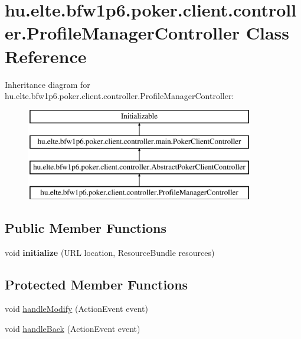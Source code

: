 \hypertarget{classhu_1_1elte_1_1bfw1p6_1_1poker_1_1client_1_1controller_1_1_profile_manager_controller}{}\section{hu.\+elte.\+bfw1p6.\+poker.\+client.\+controller.\+Profile\+Manager\+Controller Class Reference}
\label{classhu_1_1elte_1_1bfw1p6_1_1poker_1_1client_1_1controller_1_1_profile_manager_controller}
Inheritance diagram for hu.\+elte.\+bfw1p6.\+poker.\+client.\+controller.\+Profile\+Manager\+Controller\+:\begin{figure}[H]
\begin{center}
\leavevmode
\includegraphics[height=4.000000cm]{classhu_1_1elte_1_1bfw1p6_1_1poker_1_1client_1_1controller_1_1_profile_manager_controller}
\end{center}
\end{figure}
\subsection*{Public Member Functions}
\begin{DoxyCompactItemize}
\item 
\hypertarget{classhu_1_1elte_1_1bfw1p6_1_1poker_1_1client_1_1controller_1_1_profile_manager_controller_a1e0e1c2f0c103c37b67b85688be14234}{}void {\bfseries initialize} (U\+R\+L location, Resource\+Bundle resources)\label{classhu_1_1elte_1_1bfw1p6_1_1poker_1_1client_1_1controller_1_1_profile_manager_controller_a1e0e1c2f0c103c37b67b85688be14234}

\end{DoxyCompactItemize}
\subsection*{Protected Member Functions}
\begin{DoxyCompactItemize}
\item 
void \hyperlink{classhu_1_1elte_1_1bfw1p6_1_1poker_1_1client_1_1controller_1_1_profile_manager_controller_afc8afb3cf07cc1af61d094ee3c8b595a}{handle\+Modify} (Action\+Event event)
\item 
void \hyperlink{classhu_1_1elte_1_1bfw1p6_1_1poker_1_1client_1_1controller_1_1_profile_manager_controller_a5acc5680988462e83122fee59dae1a58}{handle\+Back} (Action\+Event event)
\end{DoxyCompactItemize}
